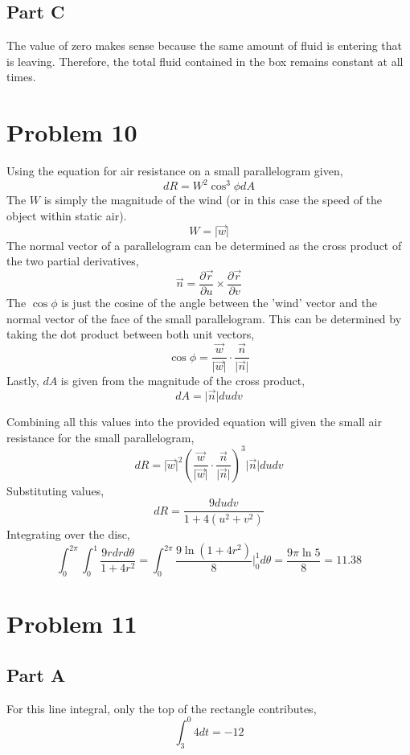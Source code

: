 \documentclass{article}
\begin{document}
\subsection*{Part C}

The value of zero makes sense because the same amount of fluid is entering that
is leaving. Therefore, the total fluid contained in the box remains constant at
all times.

\section*{Problem 10}

Using the equation for air resistance on a small parallelogram given,
$$ dR = W^2 \cos^3 \phi dA $$
The $W$ is simply the magnitude of the wind (or in this case the speed of the
object within static air).
$$ W = \vert \vec{w} \vert $$
The normal vector of a parallelogram can be determined as the cross product of
the two partial derivatives,
$$ \vec{n} = \frac{\partial \vec{r}}{\partial u} \times \frac{\partial
\vec{r}}{\partial v} $$
The $\cos \phi$ is just the cosine of the angle between the 'wind' vector and
the normal vector of the face of the small parallelogram. This can be determined
by taking the dot product between both unit vectors,
$$ \cos \phi = \frac{\vec{w}}{\vert \vec{w} \vert} \cdot \frac{ \vec{n}
}{\vert\vec{n}\vert} $$
Lastly, $dA$ is given from the magnitude of the cross product,
$$ dA = \vert \vec{n} \vert du dv $$

Combining all this values into the provided equation will given the small air
resistance for the small parallelogram,
$$ dR = \vert \vec{w} \vert^2 \left( \frac{\vec{w}}{\vert \vec{w} \vert} \cdot
\frac{ \vec{n} }{\vert\vec{n}\vert}\right)^3 \vert \vec{n} \vert du dv $$
Substituting values,
$$ dR = \frac{9 du dv}{1 + 4(u^2 + v^2)} $$
Integrating over the disc,
$$ \int_0^{2\pi}\int_0^{1} \frac{9 r dr d\theta}{1 + 4r^2} = \int_0^{2\pi}
\frac{9 \ln (1 + 4r^2)}{8} \bigg\vert_0^1 d\theta = \frac{9 \pi \ln 5}{8} =
11.38 $$

\section*{Problem 11}

\subsection*{Part A}

For this line integral, only the top of the rectangle contributes,
$$ \int_3^0 4 dt = -12 $$
\end{document}
